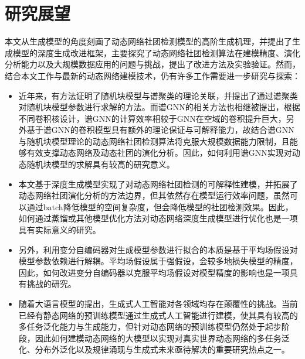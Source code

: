 \section{研究展望}

本文从生成模型的角度刻画了动态网络社团检测模型的高阶生成机理，并提出了生成模型的深度生成改进框架，主要探究了动态网络社团检测算法在建模精度、演化分析能力以及大规模数据应用的问题与挑战，提出了改进方法及实验验证。然而，结合本文工作与最新的动态网络建模技术，仍有许多工作需要进一步研究与探索：

\begin{itemize}
	\item 近年来，有方法证明了随机块模型与谱聚类的理论关联\cite{keriven2022sparse}，并提出了通过谱聚类对随机块模型参数进行求解的方法。而谱GNN\cite{wang2022powerful}的相关方法也相继被提出，根据不同卷积核设计，谱GNN的计算效率相较于GNN在空域的卷积提升巨大，另外基于谱GNN的卷积模型具有额外的理论保证与可解释能力，故结合谱GNN与随机块模型理论的动态网络社团检测算法将克服大规模数据能力限制，且能够有效支撑动态网络及动态社团的演化分析。因此，如何利用谱GNN实现对动态随机块模型的求解具有较高的研究意义。
	\item 本文基于深度生成模型实现了对动态网络社团检测的可解释性建模，并拓展了动态网络社团演化分析的方法边界，但其依然存在模型运行效率问题，虽然可以通过batch降低模型的空间复杂度，但会降低模型的社团检测效果。因此，如何通过蒸馏或其他模型优化方法对动态网络深度生成模型进行优化也是一项具有实际意义的研究。
	\item 另外，利用变分自编码器对生成模型参数进行拟合的本质是基于平均场假设对模型参数依赖进行解耦。平均场假设属于强假设，会较多地损失模型的精度，因此，如何改进变分自编码器以克服平均场假设对模型精度的影响也是一项具有挑战的研究。
    \item 随着大语言模型的提出，生成式人工智能对各领域均存在颠覆性的挑战。当前已经有静态网络的预训练模型通过生成式人工智能进行建模，使其具有较高的多任务泛化能力与生成能力，但针对动态网络的预训练模型仍然处于起步阶段，因此如何建模动态网络的大模型以实现对真实世界动态网络的多任务泛化、分布外泛化以及规律涌现与生成式未来亟待解决的重要研究热点之一。
\end{itemize}




